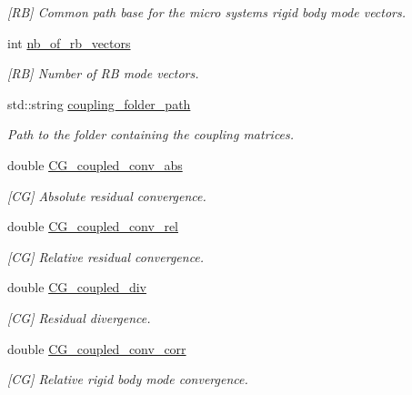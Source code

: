 \begin{DoxyCompactItemize}
\begin{DoxyCompactList}\small\item\em \mbox{[}R\+B\mbox{]} Common path base for the micro system\textquotesingle{}s rigid body mode vectors. \end{DoxyCompactList}\item 
int \hyperlink{structcarl_1_1feti__setup__init__params_a29d1a28ace280fb7fc2b7194fd9cea4a}{nb\+\_\+of\+\_\+rb\+\_\+vectors}
\begin{DoxyCompactList}\small\item\em \mbox{[}R\+B\mbox{]} Number of R\+B mode vectors. \end{DoxyCompactList}\item 
std\+::string \hyperlink{structcarl_1_1feti__setup__init__params_a5f710f34f0b3bdc9494c79c024fe2603}{coupling\+\_\+folder\+\_\+path}
\begin{DoxyCompactList}\small\item\em Path to the folder containing the coupling matrices. \end{DoxyCompactList}\item 
double \hyperlink{structcarl_1_1feti__setup__init__params_a6580c702c8e722fbfcc75f8a3945e6a1}{C\+G\+\_\+coupled\+\_\+conv\+\_\+abs}
\begin{DoxyCompactList}\small\item\em \mbox{[}C\+G\mbox{]} Absolute residual convergence. \end{DoxyCompactList}\item 
double \hyperlink{structcarl_1_1feti__setup__init__params_aae5ec90d93e9c86492d34dbba18a7dc7}{C\+G\+\_\+coupled\+\_\+conv\+\_\+rel}
\begin{DoxyCompactList}\small\item\em \mbox{[}C\+G\mbox{]} Relative residual convergence. \end{DoxyCompactList}\item 
double \hyperlink{structcarl_1_1feti__setup__init__params_ae5f29857dc1428d3faf85eb7e67de7b2}{C\+G\+\_\+coupled\+\_\+div}
\begin{DoxyCompactList}\small\item\em \mbox{[}C\+G\mbox{]} Residual divergence. \end{DoxyCompactList}\item 
double \hyperlink{structcarl_1_1feti__setup__init__params_a80f39e79e4ec2e464d8777effa5f8dab}{C\+G\+\_\+coupled\+\_\+conv\+\_\+corr}
\begin{DoxyCompactList}\small\item\em \mbox{[}C\+G\mbox{]} Relative rigid body mode convergence. \end{DoxyCompactList}\item 

\end{DoxyCompactItemize}
